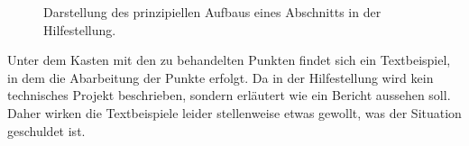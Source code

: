 \begin{figure}[h!]
\caption{Darstellung des prinzipiellen Aufbaus eines Abschnitts in der Hilfestellung.}
\label{fig:seite}
\end{figure}
%
\par
Unter dem Kasten mit den zu behandelten Punkten findet sich ein Textbeispiel, in dem die Abarbeitung der Punkte erfolgt. 
Da in der Hilfestellung wird kein technisches Projekt beschrieben, sondern erläutert wie ein Bericht aussehen soll. Daher wirken die Textbeispiele leider stellenweise etwas gewollt, was der Situation geschuldet ist. 
\par


